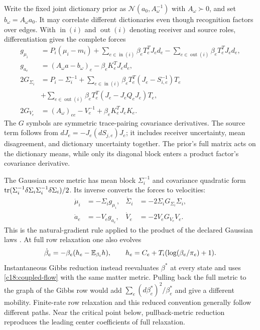Write the fixed joint dictionary prior as $\mathcal N(a_0,A_\omega^{-1})$ with $A_\omega\succ0$, and set $b_\omega=A_\omega a_0$. It may correlate different dictionaries even though recognition factors over edges. With $\operatorname{in}(i)$ and $\operatorname{out}(i)$ denoting receiver and source roles, differentiation gives the complete forces
\begin{equation}
 \begin{aligned}
 g_{\mu_i}&=P_i(\mu_i-m_i)
 +\sum_{e\in\operatorname{in}(i)}\beta_eT_e^TJ_ed_e
 -\sum_{e\in\operatorname{out}(i)}\beta_eT_e^TJ_ed_e,\\
 g_{a_e}&=(A_\omega a-b_\omega)_e-\beta_eK_e^TJ_ed_e,\\
 2G_{\Sigma_i}&=P_i-\Sigma_i^{-1}
 +\sum_{e\in\operatorname{in}(i)}\beta_eT_e^T(J_e-S_{i,e}^{-1})T_e\\
 &+\sum_{e\in\operatorname{out}(i)}\beta_eT_e^T(J_e-J_eQ_eJ_e)T_e,\\
 2G_{V_e}&=(A_\omega)_{ee}-V_e^{-1}+\beta_eK_e^TJ_eK_e .
 \end{aligned}
 \label{c18:coupled-forces}
\end{equation}
The $G$ symbols are symmetric trace-pairing covariance derivatives. The source term follows from $dJ_e=-J_e(dS_{j,e})J_e$; it includes receiver uncertainty, mean disagreement, and dictionary uncertainty together. The prior's full matrix acts on the dictionary means, while only its diagonal block enters a product factor's covariance derivative.

The Gaussian score metric has mean block $\Sigma_i^{-1}$ and covariance quadratic form $\operatorname{tr}(\Sigma_i^{-1}\delta\Sigma_i\Sigma_i^{-1}\delta\Sigma_i)/2$. Its inverse converts the forces to velocities:
\begin{equation}
 \begin{aligned}
 \dot\mu_i&=-\Sigma_i g_{\mu_i},&
 \dot\Sigma_i&=-2\Sigma_iG_{\Sigma_i}\Sigma_i,\\
 \dot a_e&=-V_eg_{a_e},&
 \dot V_e&=-2V_eG_{V_e}V_e .
 \end{aligned}
 \label{c18:coupled-flow}
\end{equation}
This is the natural-gradient rule applied to the product of the declared Gaussian laws \citep{Amari1998}. At full row relaxation one also evolves
\begin{equation}
 \dot\beta_e=-\beta_e(h_e-\mathbb E_{\beta_i}h),\qquad
 h_e=C_e+T_i(\log(\beta_e/\pi_e)+1).
 \label{c18:coupled-rows}
\end{equation}
Instantaneous Gibbs reduction instead reevaluates $\beta^*$ at every state and uses \cref{c18:coupled-flow} with the same matter metric. Pulling back the full metric to the graph of the Gibbs row would add $\sum_e(d\beta_e^*)^2/\beta_e^*$ and give a different mobility. Finite-rate row relaxation and this reduced convention generally follow different paths. Near the critical point below, pullback-metric reduction reproduces the leading center coefficients of full relaxation.

